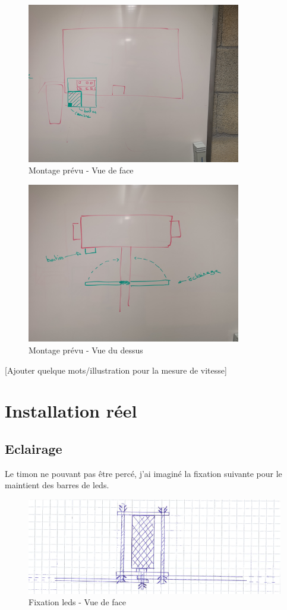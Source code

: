 \begin{figure}[H]
    \centering
    \includegraphics[height=7cm]{assets/figures/montage2.jpg}
    \caption{Montage prévu - Vue de face}
\end{figure}

\begin{figure}[H]
    \centering
    \includegraphics[height=7cm]{assets/figures/montage3.jpg}
    \caption{Montage prévu - Vue du dessus}
\end{figure}

[Ajouter quelque mots/illustration pour la mesure de vitesse]
\section{Installation réel}
\subsection{Eclairage}
Le timon ne pouvant pas être percé, j'ai imaginé la fixation suivante pour le maintient des barres de leds.

\begin{figure}[H]
    \centering
    \includegraphics[width=13cm]{assets/figures/fixation_eclairage_face.PNG}
    \caption{Fixation leds - Vue de face}
\end{figure}

